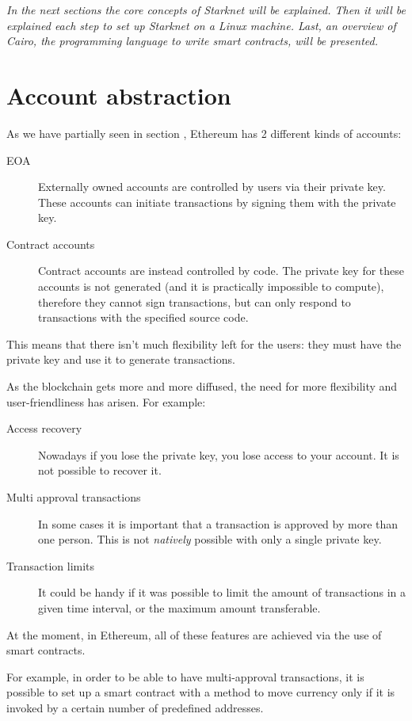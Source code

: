 \documentclass[12pt]{article}
\begin{document}
\emph{In the next sections the core concepts of Starknet will be explained. Then it will be explained each step to set up Starknet on a Linux machine. Last, an overview of Cairo, the programming language to write smart contracts, will be presented.}

\section{Account abstraction} \label{section:account_abstraction}
As we have partially seen in section , Ethereum has 2 different kinds of accounts:
\begin{description}
    \item[EOA] Externally owned accounts are controlled by users via their private key. These accounts can initiate transactions by signing them with the private key.
    \item[Contract accounts] Contract accounts are instead controlled by code. The private key for these accounts is not generated (and it is practically impossible to compute), therefore they cannot sign transactions, but can only respond to transactions with the specified source code. 
\end{description}

This means that there isn't much flexibility left for the users: they must have the private key and use it to generate transactions.

As the blockchain gets more and more diffused, the need for more flexibility and user-friendliness has arisen. For example:
\begin{description}
    \item[Access recovery] Nowadays if you lose the private key, you lose access to your account. It is not possible to recover it.
    \item[Multi approval transactions] In some cases it is important that a transaction is approved by more than one person. This is not \emph{natively} possible with only a single private key.
    \item[Transaction limits] It could be handy if it was possible to limit the amount of transactions in a given time interval, or the maximum amount transferable. 
\end{description}

At the moment, in Ethereum, all of these features are achieved via the use of smart contracts. 

For example, in order to be able to have multi-approval transactions, it is possible to set up a smart contract with a method to move currency only if it is invoked by a certain number of predefined addresses.
\end{document}
